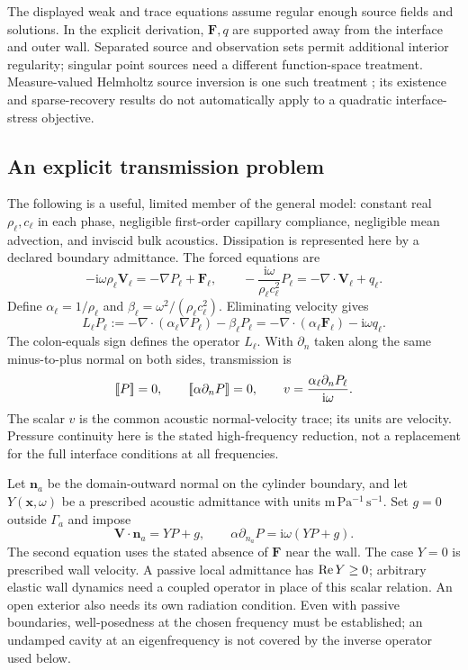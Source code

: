 The displayed weak and trace equations assume regular enough source fields
and solutions. In the explicit derivation, $\bm F,q$ are supported away from
the interface and outer wall. Separated source and observation sets permit
additional interior regularity; singular point sources need a different
function-space treatment. Measure-valued Helmholtz source inversion is one
such treatment \cite{pieper2020}; its existence and sparse-recovery results
do not automatically apply to a quadratic interface-stress objective.

\subsection{An explicit transmission problem}
The following is a useful, limited member of the general model: constant
real $\rho_\ell,c_\ell$ in each phase, negligible first-order capillary
compliance, negligible mean advection, and inviscid bulk acoustics. Dissipation
is represented here by a declared boundary admittance. The forced equations are
\begin{equation}
 -\mathrm i\omega\rho_\ell\bm V_\ell=-\nabla P_\ell+\bm F_\ell,
 \qquad
 -\frac{\mathrm i\omega}{\rho_\ell c_\ell^2}P_\ell
       =-\nabla\cdot\bm V_\ell+q_\ell.
 \label{eq:forced-first-order}
\end{equation}
Define $\alpha_\ell=1/\rho_\ell$ and
$\beta_\ell=\omega^2/(\rho_\ell c_\ell^2)$. Eliminating velocity gives
\begin{equation}
 L_\ell P_\ell:=-\nabla\cdot(\alpha_\ell\nabla P_\ell)-\beta_\ell P_\ell
       =-\nabla\cdot(\alpha_\ell\bm F_\ell)-\mathrm i\omega q_\ell.
 \label{eq:forced-helmholtz}
\end{equation}
The colon-equals sign defines the operator $L_\ell$. With $\partial_n$ taken
along the same minus-to-plus normal on both sides, transmission is
\begin{equation}
 \left[\!\left[P\right]\!\right]=0,\qquad \left[\!\left[\alpha\partial_nP\right]\!\right]=0,
 \qquad v=\frac{\alpha_\ell\partial_nP_\ell}{\mathrm i\omega}.
 \label{eq:transmission-source}
\end{equation}
The scalar $v$ is the common acoustic normal-velocity trace; its units are
velocity. Pressure continuity here is the stated high-frequency reduction,
not a replacement for the full interface conditions at all frequencies.

Let $\bm n_a$ be the domain-outward normal on the cylinder boundary, and let
$Y(\bm x,\omega)$ be a prescribed acoustic admittance with units
$\mathrm{m\,Pa^{-1}\,s^{-1}}$. Set $g=0$ outside $\Gamma_a$ and impose
\begin{equation}
 \bm V\cdot\bm n_a=YP+g,
 \qquad
 \alpha\partial_{n_a}P=\mathrm i\omega(YP+g).
 \label{eq:source-robin}
\end{equation}
The second equation uses the stated absence of $\bm F$ near the wall.
The case $Y=0$ is prescribed wall velocity. A passive local admittance has
$\operatorname{Re} Y\geq0$; arbitrary elastic wall dynamics need a coupled operator in
place of this scalar relation. An open exterior also needs its own radiation
condition. Even with passive boundaries, well-posedness at the chosen frequency
must be established; an undamped cavity at an eigenfrequency is not covered
by the inverse operator used below.

